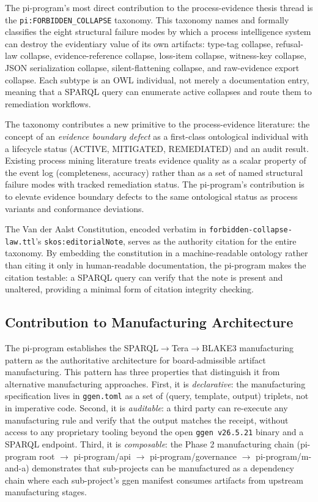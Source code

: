 The pi-program's most direct contribution to the process-evidence thesis thread is the \texttt{pi:FORBIDDEN\_COLLAPSE} taxonomy. This taxonomy names and formally classifies the eight structural failure modes by which a process intelligence system can destroy the evidentiary value of its own artifacts: type-tag collapse, refusal-law collapse, evidence-reference collapse, loss-item collapse, witness-key collapse, JSON serialization collapse, silent-flattening collapse, and raw-evidence export collapse. Each subtype is an OWL individual, not merely a documentation entry, meaning that a SPARQL query can enumerate active collapses and route them to remediation workflows.

The taxonomy contributes a new primitive to the process-evidence literature: the concept of an \textit{evidence boundary defect} as a first-class ontological individual with a lifecycle status (ACTIVE, MITIGATED, REMEDIATED) and an audit result. Existing process mining literature treats evidence quality as a scalar property of the event log (completeness, accuracy) rather than as a set of named structural failure modes with tracked remediation status. The pi-program's contribution is to elevate evidence boundary defects to the same ontological status as process variants and conformance deviations.

The Van der Aalst Constitution, encoded verbatim in \texttt{forbidden-collapse-law.ttl}'s \texttt{skos:editorialNote}, serves as the authority citation for the entire taxonomy. By embedding the constitution in a machine-readable ontology rather than citing it only in human-readable documentation, the pi-program makes the citation testable: a SPARQL query can verify that the note is present and unaltered, providing a minimal form of citation integrity checking.

\subsection{Contribution to Manufacturing Architecture}
\label{sec:research-pi-program-contribution-manufacturing}

The pi-program establishes the SPARQL$\to$Tera$\to$BLAKE3 manufacturing pattern as the authoritative architecture for board-admissible artifact manufacturing. This pattern has three properties that distinguish it from alternative manufacturing approaches. First, it is \textit{declarative}: the manufacturing specification lives in \texttt{ggen.toml} as a set of (query, template, output) triplets, not in imperative code. Second, it is \textit{auditable}: a third party can re-execute any manufacturing rule and verify that the output matches the receipt, without access to any proprietary tooling beyond the open \texttt{ggen v26.5.21} binary and a SPARQL endpoint. Third, it is \textit{composable}: the Phase 2 manufacturing chain (pi-program root $\to$ pi-program/api $\to$ pi-program/governance $\to$ pi-program/m-and-a) demonstrates that sub-projects can be manufactured as a dependency chain where each sub-project's ggen manifest consumes artifacts from upstream manufacturing stages.

